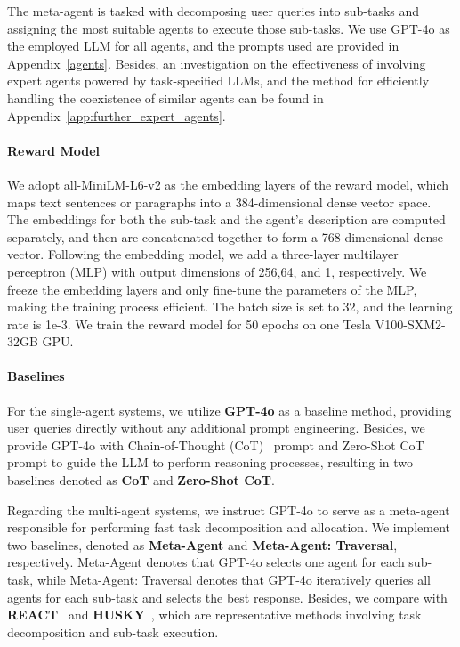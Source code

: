 The meta-agent is tasked with decomposing user queries into sub-tasks and assigning the most suitable agents to execute those sub-tasks. We use GPT-4o as the employed LLM for all agents, and the prompts used are provided in Appendix~\ref{agents}.
Besides, an investigation on the effectiveness of involving expert agents powered by task-specified LLMs, and the method for efficiently handling the coexistence of similar agents can be found in Appendix~\ref{app:further_expert_agents}.


\paragraph{Reward Model} 
We adopt all-MiniLM-L6-v2 \citep{wang2020minilm} as the embedding layers of the reward model, which maps text sentences or paragraphs into a 384-dimensional dense vector space. The embeddings for both the sub-task and the agent's description are computed separately, and then are concatenated together to form a 768-dimensional dense vector. 
Following the embedding model, we add a three-layer multilayer perceptron (MLP) with output dimensions of 256,64, and 1, respectively. 
We freeze the embedding layers and only fine-tune the parameters of the MLP, making the training process efficient. The batch size is set to 32, and the learning rate is 1e-3. We train the reward model for 50 epochs on one Tesla V100-SXM2-32GB GPU.


\paragraph{Baselines} 
For the single-agent systems, we utilize {\bf GPT-4o} as a baseline method, providing user queries directly without any additional prompt engineering. 
Besides, we provide GPT-4o with Chain-of-Thought (CoT)~\citep{wei2022chain} prompt and Zero-Shot CoT~\citep{kojima2022large} prompt to guide the LLM to perform reasoning processes, resulting in two baselines denoted as {\bf CoT} and {\bf Zero-Shot CoT}. 


Regarding the multi-agent systems, we instruct GPT-4o to serve as a meta-agent responsible for performing fast task decomposition and allocation. We implement two baselines, denoted as {\bf Meta-Agent} and {\bf Meta-Agent: Traversal}, respectively. Meta-Agent denotes that GPT-4o selects one agent for each sub-task, while Meta-Agent: Traversal denotes that GPT-4o iteratively queries all agents for each sub-task and selects the best response. Besides, we compare \name with {\bf REACT}~\citep{yao2022react} and {\bf HUSKY}~\citep{kim2024husky}, which are representative methods involving task decomposition and sub-task execution.

